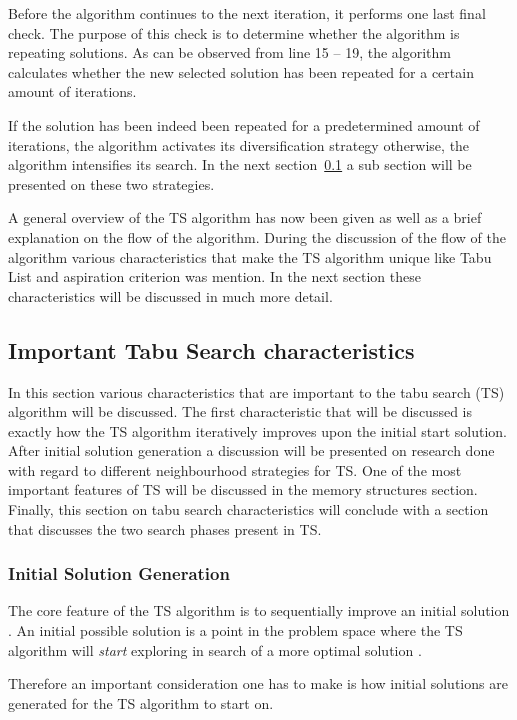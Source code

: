 Before the algorithm continues to the next iteration, it performs one last final check. The purpose of this check is to determine whether the algorithm is repeating solutions. As can be observed from line 15 -- 19, the algorithm calculates whether the new selected solution has been repeated for a certain amount of iterations. 

If the solution has been indeed been repeated for a predetermined amount of iterations, the algorithm activates its diversification strategy otherwise, the algorithm intensifies its search. In the next section~\ref{sec:TScharacteristics} a sub section will be presented on these two strategies.

A general overview of the TS algorithm has now been given as well as a brief explanation on the flow of the algorithm. During the discussion of the flow of the algorithm various characteristics that make the TS algorithm unique like Tabu List and aspiration criterion was mention. In the next section these characteristics will be discussed in much more detail.

\subsection{Important Tabu Search characteristics}
\label{sec:TScharacteristics}
In this section various characteristics that are important to the tabu search (TS) algorithm will be discussed. The first characteristic that will be discussed is exactly how the TS algorithm iteratively improves upon the initial start solution. After initial solution generation a discussion will be presented on research done with regard to different neighbourhood strategies for TS. One of the most important features of TS will be discussed in the memory structures section. Finally, this section on tabu search characteristics will conclude with a section that discusses the two search phases present in TS.

\subsubsection{Initial Solution Generation}
The core feature of the TS algorithm is to sequentially improve an initial solution \cite{TSHazardous}. An initial possible solution is a point in the problem space where the TS algorithm will \emph{start} exploring in search of a more optimal solution \cite{AIModernApproach,TSHazardous}.

Therefore an important consideration one has to make is how initial solutions are generated for the TS algorithm to start on\cite{AIModernApproach,TSHazardous}.

